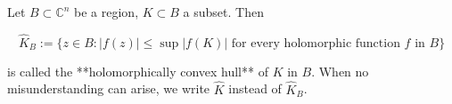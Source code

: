 Let $B \subset \mathbb{C}^n$ be a region, $K \subset B$ a subset. Then

$$\hat{K}_B := \{ z \in B : |f(z)| \leq \sup|f(K)| \text{ for every holomorphic function } f \text{ in } B \}$$

is called the **holomorphically convex hull** of $K$ in $B$. When no misunderstanding can arise, we write $\hat{K}$ instead of $\hat{K}_B$.
